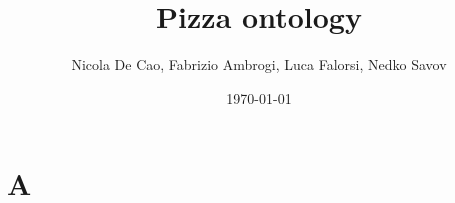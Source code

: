 \documentclass[a4paper]{article}
\title{Pizza ontology}
\author{Nicola De Cao, Fabrizio Ambrogi, Luca Falorsi, Nedko Savov}
\date{\today}
\begin{document}
 	\maketitle
		
\section{A}
\end{document}
